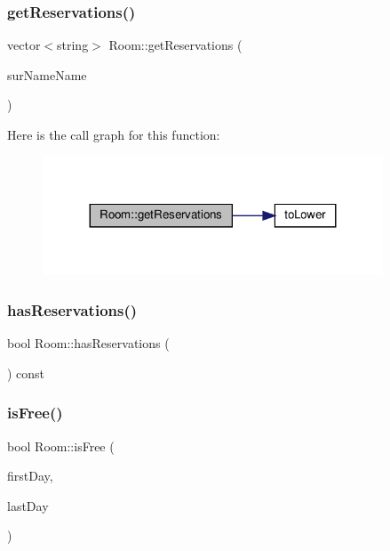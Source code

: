 \subsubsection{\texorpdfstring{get\+Reservations()}{getReservations()}}
{\footnotesize\ttfamily vector$<$string$>$ Room\+::get\+Reservations (\begin{DoxyParamCaption}\item[{string}]{sur\+Name\+Name }\end{DoxyParamCaption})\hspace{0.3cm}{\ttfamily [inline]}}

Here is the call graph for this function\+:\nopagebreak
\begin{figure}[H]
\begin{center}
\leavevmode
\includegraphics[width=287pt]{class_room_a10d6dafe0c9e42cfaa19c049e0263d99_cgraph}
\end{center}
\end{figure}
\mbox{\label{class_room_ad05581dd91f323159ee69d52197ed595}} 
\subsubsection{\texorpdfstring{has\+Reservations()}{hasReservations()}}
{\footnotesize\ttfamily bool Room\+::has\+Reservations (\begin{DoxyParamCaption}{ }\end{DoxyParamCaption}) const\hspace{0.3cm}{\ttfamily [inline]}}

\mbox{\label{class_room_a72182e2599a2aac3312ef8aa040803af}} 
\subsubsection{\texorpdfstring{is\+Free()}{isFree()}}
{\footnotesize\ttfamily bool Room\+::is\+Free (\begin{DoxyParamCaption}\item[{Q\+Date}]{first\+Day,  }\item[{Q\+Date}]{last\+Day }\end{DoxyParamCaption})}

